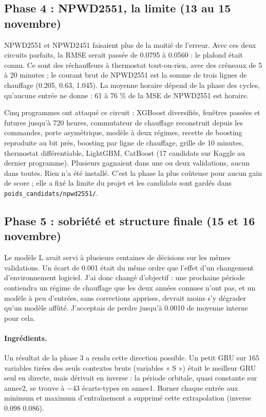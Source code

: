 \documentclass[11pt,a4paper]{article}
\newcommand{\code}[1]{\texttt{#1}}
\begin{document}
\subsection{Phase 4 : NPWD2551, la limite (13 au 15 novembre)}

NPWD2551 et NPWD2451 faisaient plus de la moitié de l'erreur. Avec ces deux circuits parfaits, la RMSE serait passée de 0.0795 à 0.0560 : le plafond était connu. Ce sont des réchauffeurs à thermostat tout-ou-rien, avec des créneaux de 5 à 20 minutes ; le courant brut de NPWD2551 est la somme de trois lignes de chauffage (0.205, 0.63, 1.045). La moyenne horaire dépend de la phase des cycles, qu'aucune entrée ne donne : 61 à 76 \% de la MSE de NPWD2551 est horaire.

Cinq programmes ont attaqué ce circuit : XGBoost diversifiés, fenêtres passées et futures jusqu'à 720 heures, commutateur de chauffage reconstruit depuis les commandes, porte asymétrique, modèle à deux régimes, recette de boosting reproduite au bit près, boosting par ligne de chauffage, grille de 10 minutes, thermostat différentiable, LightGBM, CatBoost (17 candidats sur Kaggle au dernier programme). Plusieurs gagnaient dans une ou deux validations, aucun dans toutes. Rien n'a été installé. C'est la phase la plus coûteuse pour aucun gain de score ; elle a fixé la limite du projet et les candidats sont gardés dans \code{poids\_candidats/npwd2551/}.

\subsection{Phase 5 : sobriété et structure finale (15 et 16 novembre)}
\label{sec:sobriete}

Le modèle L avait servi à plusieurs centaines de décisions sur les mêmes validations. Un écart de 0.001 était du même ordre que l'effet d'un changement d'environnement logiciel. J'ai donc changé d'objectif : une prochaine période contiendra un régime de chauffage que les deux années connues n'ont pas, et un modèle à peu d'entrées, sans corrections apprises, devrait moins s'y dégrader qu'un modèle affûté. J'acceptais de perdre jusqu'à 0.0010 de moyenne interne pour cela.

\paragraph{Ingrédients.} Un résultat de la phase 3 a rendu cette direction possible. Un petit GRU sur 165 variables tirées des seuls contextes bruts (variables « S ») était le meilleur GRU seul en directe, mais dérivait en inverse : la période orbitale, quasi constante sur annee2, se trouve à $-43$ écarts-types en annee1. Borner chaque entrée aux minimum et maximum d'entraînement a supprimé cette extrapolation (inverse 0.098 \textrightarrow{} 0.086).
\end{document}
